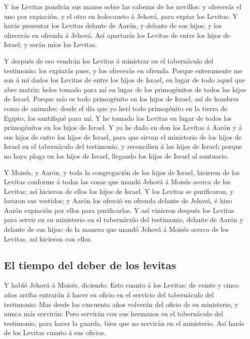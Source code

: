  Y los Levitas pondrán sus manos sobre las cabezas de los
novillos: y ofrecerás el uno por expiación, y el otro en holocausto á
Jehová, para expiar los Levitas.  Y harás presentar los
Levitas delante de Aarón, y delante de sus hijos, y los ofrecerás en
ofrenda á Jehová.  Así apartarás los Levitas de entre los
hijos de Israel; y serán míos los Levitas.

 Y después de eso vendrán los Levitas á ministrar en el
tabernáculo del testimonio: los expiarás pues, y los ofrecerás en
ofrenda.  Porque enteramente me son á mí dados los
Levitas de entre los hijos de Israel, en lugar de todo aquel que abre
matriz; helos tomado para mí en lugar de los primogénitos de todos los
hijos de Israel.  Porque mío es todo primogénito en los
hijos de Israel, así de hombres como de animales; desde el día que yo
herí todo primogénito en la tierra de Egipto, los santifiqué para mí.
 Y he tomado los Levitas en lugar de todos los
primogénitos en los hijos de Israel.  Y yo he dado en don
los Levitas á Aarón y á sus hijos de entre los hijos de Israel, para que
sirvan el ministerio de los hijos de Israel en el tabernáculo del
testimonio, y reconcilien á los hijos de Israel; porque no haya plaga en
los hijos de Israel, llegando los hijos de Israel al santuario.

 Y Moisés, y Aarón, y toda la congregación de los hijos
de Israel, hicieron de los Levitas conforme á todas las cosas que mandó
Jehová á Moisés acerca de los Levitas; así hicieron de ellos los hijos
de Israel.  Y los Levitas se purificaron, y lavaron sus
vestidos; y Aarón los ofreció en ofrenda delante de Jehová, é hizo Aarón
expiación por ellos para purificarlos.  Y así vinieron
después los Levitas para servir en su ministerio en el tabernáculo del
testimonio, delante de Aarón y delante de sus hijos: de la manera que
mandó Jehová á Moisés acerca de los Levitas, así hicieron con ellos.

\hypertarget{el-tiempo-del-deber-de-los-levitas}{%
\subsection{El tiempo del deber de los
levitas}\label{el-tiempo-del-deber-de-los-levitas}}

 Y habló Jehová á Moisés, diciendo:  Esto
cuanto á los Levitas: de veinte y cinco años arriba entrarán á hacer su
oficio en el servicio del tabernáculo del testimonio: 
Mas desde los cincuenta años volverán del oficio de su ministerio, y
nunca más servirán:  Pero servirán con sus hermanos en el
tabernáculo del testimonio, para hacer la guarda, bien que no servirán
en el ministerio. Así harás de los Levitas cuanto á sus oficios.

